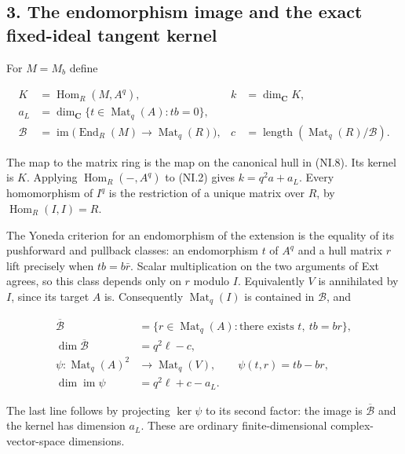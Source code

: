 \subsection{3. The endomorphism image and the exact fixed-ideal tangent kernel}\label{SF-E849:s3}

For \(M=M_b\) define

\[
 \begin{split}
 K&=\operatorname{Hom}_R(M,A^q),&
 k&=\dim_{\mathbf C}K,\\
 a_L&=\dim_{\mathbf C}\{t\in\operatorname{Mat}_q(A):tb=0\},\\
 \mathcal B&=\operatorname{im}\bigl(
       \operatorname{End}_R(M)\longrightarrow\operatorname{Mat}_q(R)
                                    \bigr),&
 c&=\operatorname{length}(\operatorname{Mat}_q(R)/\mathcal B).
 \end{split}
 \tag{NI.11}
\]

The map to the matrix ring is the map on the canonical hull in
(NI.8). Its kernel is \(K\). Applying \(\operatorname{Hom}_R(-,A^q)\) to (NI.2) gives
\(k=q^2a+a_L\). Every homomorphism of \(I^q\) is the restriction of a
unique matrix over \(R\), by \(\operatorname{Hom}_R(I,I)=R\).

The Yoneda criterion for an endomorphism of the extension is the
equality of its pushforward and pullback classes: an endomorphism
\(t\) of \(A^q\) and a hull matrix \(r\) lift precisely when \(tb=b\bar r\).
Scalar multiplication on the two arguments of Ext agrees, so
this class depends only on \(r\) modulo \(I\). Equivalently \(V\) is
annihilated by \(I\), since its target \(A\) is. Consequently
\(\operatorname{Mat}_q(I)\) is contained in \(\mathcal B\), and

\[
 \begin{split}
 \overline{\mathcal B}
  &=\{r\in\operatorname{Mat}_q(A):
                   \text{there exists }t,\ tb=br\},\\
 \dim\overline{\mathcal B}&=q^2\ell-c,\\
 \psi:\operatorname{Mat}_q(A)^2&\longrightarrow
                 \operatorname{Mat}_q(V),\qquad
                    \psi(t,r)=tb-br,\\
 \dim\operatorname{im}\psi&=q^2\ell+c-a_L.
 \end{split}
 \tag{NI.12}
\]

The last line follows by projecting \(\ker\psi\) to its second factor:
the image is \(\overline{\mathcal B}\) and the kernel has dimension \(a_L\). These are
ordinary finite-dimensional complex-vector-space dimensions.

